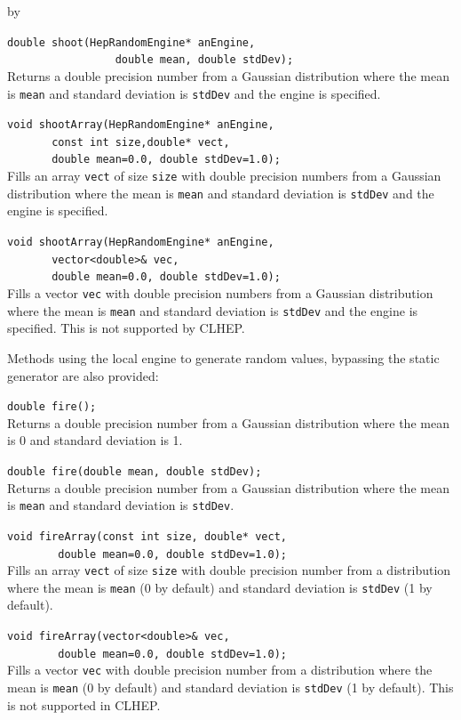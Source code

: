 \documentclass[twoside]{article}
\newcommand{\comp}[1]{\texttt{#1}}%
\newcommand{\entrylabel}[1]{\mbox{\textbf{{#1}}}\hfil}%
\newenvironment{entry}
{\begin{list}{}%
    {\renewcommand{\makelabel}{\entrylabel}%
     \setlength{\labelwidth}{90pt}%
     \setlength{\leftmargin}{\labelwidth}
     \advance\leftmargin by \labelsep%
      }%
    }%
  {\end{list}}
\newcommand{\Entrylabel}[1]%
{\raisebox{0pt}[1ex][0pt]{\makebox[\labelwidth][l]%
    {\parbox[t]{\labelwidth}{\hspace{0pt}\textbf{{#1}}}}}}
\newenvironment{Entry}%
{\renewcommand{\entrylabel}{\Entrylabel}\begin{entry}}%
  {\end{entry}}
\begin{document}
\begin{description}
\begin{Entry}
  \verb+double shoot(HepRandomEngine* anEngine,+\\ 
  \verb+                 double mean, double stdDev);+\\
  Returns a double precision number from a Gaussian distribution where the
  mean is \comp{mean} and standard deviation is \comp{stdDev}
  and the engine is specified.

  \verb+void shootArray(HepRandomEngine* anEngine,+\\
  \verb+       const int size,double* vect,+\\ 
  \verb+       double mean=0.0, double stdDev=1.0);+\\
  Fills an array \comp{vect} of size \comp{size} with double precision
  numbers from a Gaussian distribution where the
  mean is \comp{mean} and standard deviation is \comp{stdDev}
  and the engine is specified.

  \verb+void shootArray(HepRandomEngine* anEngine,+\\
  \verb+       vector<double>& vec,+\\ 
  \verb+       double mean=0.0, double stdDev=1.0);+\\
  Fills a vector \comp{vec} with double precision
  numbers from a Gaussian distribution where the
  mean is \comp{mean} and standard deviation is \comp{stdDev}
  and the engine is specified.  This is not supported by CLHEP.
  
  Methods using the local engine to generate random values, bypassing
  the static generator are also provided:

  \verb+double fire();+\\
  Returns a double precision number from a Gaussian distribution where the
  mean is 0 and standard deviation is 1.
  
  \verb+double fire(double mean, double stdDev);+\\
  Returns a double precision number from a Gaussian distribution where the
  mean is \comp{mean} and standard deviation is \comp{stdDev}.
  
  \verb+void fireArray(const int size, double* vect,+\\
  \verb+        double mean=0.0, double stdDev=1.0);+\\
  Fills an array \comp{vect} of size \comp{size} with double
  precision number from a distribution where the
  mean is \comp{mean} (0 by default) and standard
  deviation is \comp{stdDev} (1 by default).

  \verb+void fireArray(vector<double>& vec,+\\
  \verb+        double mean=0.0, double stdDev=1.0);+\\
  Fills a vector \comp{vec} with double
  precision number from a distribution where the
  mean is \comp{mean} (0 by default) and standard
  deviation is \comp{stdDev} (1 by default).  This is not
  supported in CLHEP.
  

\end{Entry}
\end{description}
\end{document}

